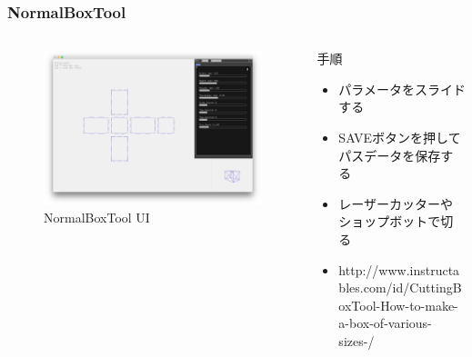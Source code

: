 \documentclass[10pt, dvipdfmx]{beamer}
\begin{document}
        \begin{frame}
            \frametitle{NormalBoxTool}
            \tiny
            \begin{columns}[c]
                \begin{column}{0.50\textwidth}
                    \begin{figure}[htb]
                        \includegraphics[width=\columnwidth]{images/04.png}
                        \caption{NormalBoxTool UI}
                        \label{fig:01}
                    \end{figure}
                \end{column}
                \begin{column}{0.50\textwidth}
                    \begin{block}{手順}
                        \begin{itemize}
                            \item パラメータをスライドする
                            \item SAVEボタンを押してパスデータを保存する
                            \item レーザーカッターやショップボットで切る
                            \item http://www.instructables.com/id/CuttingBoxTool-How-to-make-a-box-of-various-sizes-/
                        \end{itemize}
                    \end{block}
                \end{column}
            \end{columns}
        \end{frame}
\end{document}

